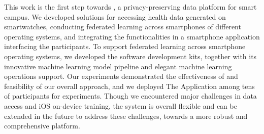 This work is the first step towards \fedcampus,
a privacy-preserving data platform for smart campus.
We developed solutions for accessing health data generated on smartwatches,
conducting federated learning across smartphones of different operating systems,
and integrating the functionalities in a smartphone application interfacing the
participants. To support federated learning across smartphone operating systems,
we developed the \fedkit software development kits,
together with its innovative machine learning model pipeline and elegant machine
learning operations support.
Our experiments demonstrated the effectiveness of \fedkit and feasibility of our
overall approach,
and we deployed The \fedcampus Application among tens of participants for
experiments.
Though we encountered major challenges in data access and iOS on-device
training,
the system is overall flexible and can be extended in the future to address
these challenges, towards a more robust and comprehensive \fedcampus platform.
